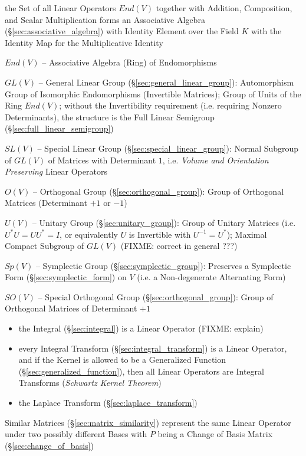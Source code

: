 the Set of all Linear Operators $End(V)$ together with Addition, Composition,
and Scalar Multiplication forms an Associative Algebra
(\S\ref{sec:associative_algebra}) with Identity Element over the Field $K$ with
the Identity Map for the Multiplicative Identity

$End(V)$ -- Associative Algebra (Ring) of Endomorphisms

$GL(V)$ -- General Linear Group (\S\ref{sec:general_linear_group}):
Automorphism Group of Isomorphic Endomorphisms (Invertible Matrices); Group of
Units of the Ring $End(V)$; without the Invertibility requirement (i.e.
requiring Nonzero Determinants), the structure is the Full Linear Semigroup
(\S\ref{sec:full_linear_semigroup})

$SL(V)$ -- Special Linear Group (\S\ref{sec:special_linear_group}): Normal
Subgroup of $GL(V)$ of Matrices with Determinant $1$, i.e. \emph{Volume and
  Orientation Preserving} Linear Operators

$O(V)$ -- Orthogonal Group (\S\ref{sec:orthogonal_group}): Group of Orthogonal
Matrices (Determinant $+1$ or $-1$)

$U(V)$ -- Unitary Group (\S\ref{sec:unitary_group}): Group of Unitary Matrices
(i.e. $U^*U = UU^* = I$, or equivalently $U$ is Invertible with $U^{-1} =
U^*$); Maximal Compact Subgroup of $GL(V)$ (FIXME: correct in general ???)

$Sp(V)$ -- Symplectic Group (\S\ref{sec:symplectic_group}): Preserves a
Symplectic Form (\S\ref{sec:symplectic_form}) on $V$ (i.e. a Non-degenerate
Alternating Form)

$SO(V)$ -- Special Orthogonal Group (\S\ref{sec:orthogonal_group}): Group of
Orthogonal Matrices of Determinant $+1$

\begin{itemize}
  \item the Integral (\S\ref{sec:integral}) is a Linear Operator (FIXME:
    explain)
  \item every Integral Transform (\S\ref{sec:integral_transform}) is a Linear
    Operator, and if the Kernel is allowed to be a Generalized Function
    (\S\ref{sec:generalized_function}), then all Linear Operators are Integral
    Transforms (\emph{Schwartz Kernel Theorem})
  \item the Laplace Transform (\S\ref{sec:laplace_transform})
\end{itemize}

Similar Matrices (\S\ref{sec:matrix_similarity}) represent the same Linear
Operator under two possibly different Bases with $P$ being a Change of Basis
Matrix (\S\ref{sec:change_of_basis})



